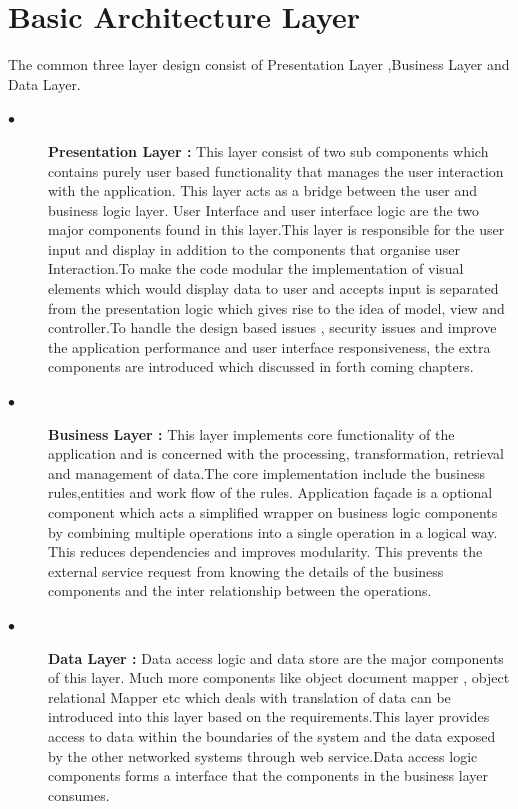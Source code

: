\section{Basic Architecture Layer}
						
						The common three layer design consist of Presentation Layer ,Business Layer and Data Layer. 
						
						
\begin{description}
  \item[$\bullet$] {\bfseries Presentation Layer :} This layer consist of two sub components which contains purely user based functionality that manages the user interaction with the application. This layer acts as a bridge between the user and business logic layer. User Interface and user interface logic are the two major components found in this layer.This layer is responsible for the user input and display in addition to the components that organise user Interaction.To make the code modular the implementation of visual elements which would display data to user and accepts input is separated from the presentation logic which gives rise to the idea of model, view and controller.To handle the design based issues , security issues and improve the application performance and user interface responsiveness, the extra components are introduced which discussed in forth coming chapters.
  \item[$\bullet$] {\bfseries Business Layer :} This layer implements core functionality of the application and is concerned with the processing, transformation, retrieval and management of data.The core implementation include the business rules,entities and work flow of the rules. Application façade is a optional component which acts a simplified wrapper on business logic components by combining multiple operations into a single operation in a logical way. This reduces dependencies and improves modularity. This prevents the external service request from knowing the details of the business components and the inter relationship between the operations.
  \item[$\bullet$] {\bfseries Data Layer :} Data access logic and data store are the major components of this layer. Much more components like object document mapper , object relational Mapper etc which deals with translation of data can be introduced into this layer based on the requirements.This layer provides access to data within the boundaries of the system and the data exposed by the other networked systems through web service.Data access logic components forms a interface that the components in the business layer consumes. 
\end{description}			

